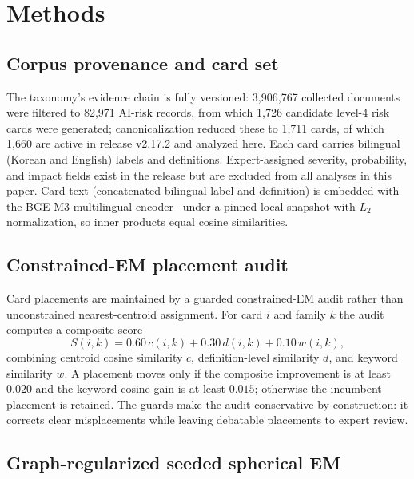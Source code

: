 \documentclass[11pt,a4paper]{article}
\begin{document}
\section*{Methods}

\subsection*{Corpus provenance and card set}

The taxonomy's evidence chain is fully versioned: 3,906,767 collected documents were filtered to 82,971 AI-risk records, from which 1,726 candidate level-4 risk cards were generated; canonicalization reduced these to 1,711 cards, of which 1,660 are active in release v2.17.2 and analyzed here. Each card carries bilingual (Korean and English) labels and definitions. Expert-assigned severity, probability, and impact fields exist in the release but are excluded from all analyses in this paper. Card text (concatenated bilingual label and definition) is embedded with the BGE-M3 multilingual encoder~\cite{chen2024} under a pinned local snapshot with $L_2$ normalization, so inner products equal cosine similarities.

\subsection*{Constrained-EM placement audit}

Card placements are maintained by a guarded constrained-EM audit rather than unconstrained nearest-centroid assignment. For card $i$ and family $k$ the audit computes a composite score
\begin{equation}
S(i,k)=0.60\,c(i,k)+0.30\,d(i,k)+0.10\,w(i,k),
\end{equation}
combining centroid cosine similarity $c$, definition-level similarity $d$, and keyword similarity $w$. A placement moves only if the composite improvement is at least $0.020$ and the keyword-cosine gain is at least $0.015$; otherwise the incumbent placement is retained. The guards make the audit conservative by construction: it corrects clear misplacements while leaving debatable placements to expert review.

\subsection*{Graph-regularized seeded spherical EM}
\end{document}
